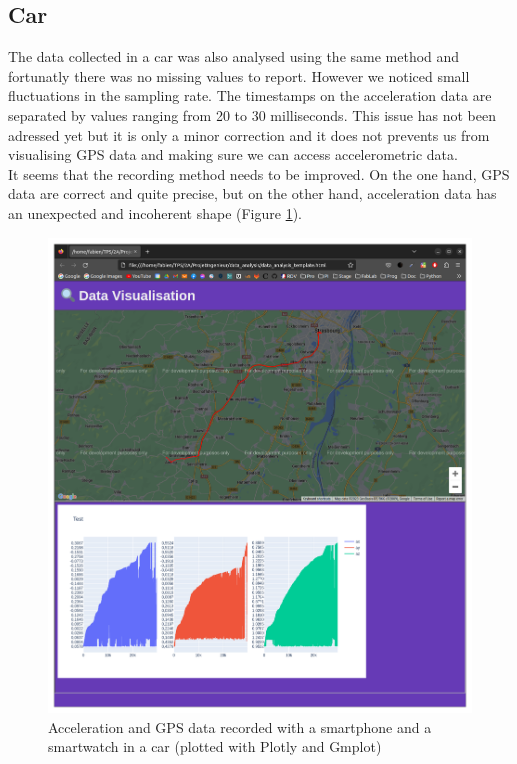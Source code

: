 \subsection{Car}
The data collected in a car was also analysed using the same method and fortunatly there was no missing values to report. However we noticed small fluctuations in the sampling rate. The timestamps on the acceleration data are separated by values ranging from 20 to 30 milliseconds. This issue has not been adressed yet but it is only a minor correction and it does not prevents us from visualising GPS data and making sure we can access accelerometric data.\\

It seems that the recording method needs to be improved. On the one hand, GPS data are correct and quite precise, but on the other hand, acceleration data has an unexpected and incoherent shape (Figure \ref{gps_1}).\\

\begin{figure}
    \center
    \includegraphics[scale=.25]{img/gps_1.png}
    \caption{Acceleration and GPS data recorded with a smartphone and a smartwatch in a car (plotted with Plotly and Gmplot)}
    \label{gps_1}
\end{figure}

